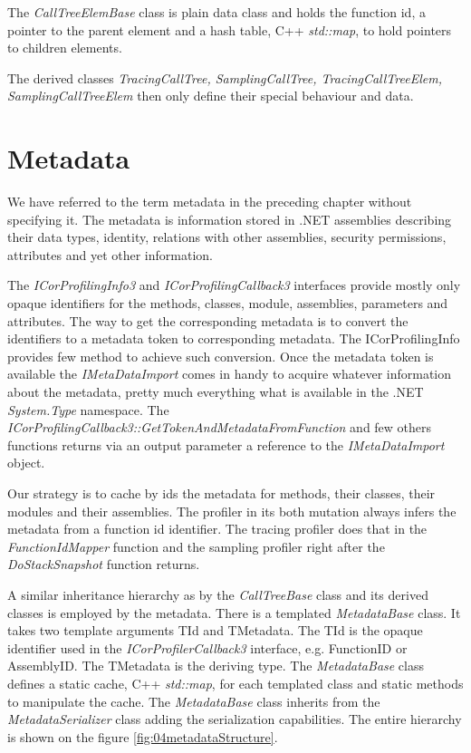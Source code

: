 The \textit{CallTreeElemBase} class is plain data class and holds the function id, a pointer to the parent element and a hash table, C++ \textit{std::map}, to hold pointers to children elements.

The derived classes \textit{TracingCallTree, SamplingCallTree, TracingCallTreeElem, SamplingCallTreeElem} then only define their special behaviour and data. 

\section{Metadata}
We have referred to the term metadata in the preceding chapter without specifying it. The metadata is information stored in .NET assemblies describing their data types, identity, relations with other assemblies, security permissions, attributes and yet other information.

The \textit{ICorProfilingInfo3} and \textit{ICorProfilingCallback3} interfaces provide mostly only opaque identifiers for the methods, classes, module, assemblies, parameters and attributes. The way to get the corresponding metadata is to convert the identifiers to a metadata token to corresponding metadata. The ICorProfilingInfo provides few method to achieve such conversion. Once the metadata token is available the \textit{IMetaDataImport} comes in handy \cite{ProfMSDNMetaData} to acquire whatever information about the metadata, pretty much everything what is available in the .NET \textit{System.Type} namespace. The \textit{ICorProfilingCallback3::GetTokenAndMetadataFromFunction} and few others functions returns via an output parameter a reference to the \textit{IMetaDataImport} object. 

Our strategy is to cache by ids the metadata for methods, their classes, their modules and their assemblies. The profiler in its both mutation always infers the metadata from a function id identifier. The tracing profiler does that in the \textit{FunctionIdMapper} function and the sampling profiler right after the \textit{DoStackSnapshot} function returns.

A similar inheritance hierarchy as by the \textit{CallTreeBase} class and its derived classes is employed by the metadata. There is a templated \textit{MetadataBase} class. It takes two template arguments TId and TMetadata. The TId is the opaque identifier used in the \textit{ICorProfilerCallback3} interface, e.g. FunctionID or AssemblyID. The TMetadata is the deriving type. The \textit{MetadataBase} class defines a static cache, C++ \textit{std::map}, for each templated class and static methods to manipulate the cache. The \textit{MetadataBase} class inherits from the \textit{MetadataSerializer} class adding the serialization capabilities. The entire hierarchy is shown on the figure \ref{fig:04metadataStructure}.

